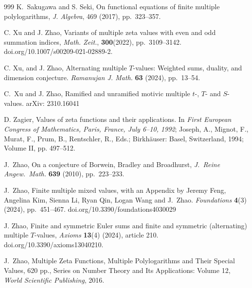\documentclass{article}
\theoremstyle{plain}
\theoremstyle{definition}
\begin{document}
\begin{thebibliography}{999}
K.\ Sakugawa and S. Seki, On functional equations of finite multiple polylogarithms, \emph{J. Algebra}, 469 (2017), pp.\ 323--357.

C. Xu and J. Zhao, Variants of multiple zeta values with even and odd summation indices,
\emph{Math. Zeit.}, \textbf{300}(2022), pp.\ 3109--3142.
doi.org/10.1007/s00209-021-02889-2.

C. Xu, and J. Zhao, Alternating multiple $T$-values: Weighted sums, duality, and dimension conjecture.
\emph{Ramanujan J. Math.} \textbf{63} (2024), pp.\ 13--54.

C.\ Xu and J. Zhao, Ramified and unramified motivic multiple $t$-, $T$- and $S$-values. arXiv: 2310.16041

D. Zagier, Values of zeta functions and their applications.
In \emph{First European Congress of Mathematics, Paris, France, July 6--10, 1992}; Joseph, A., Mignot,
F., Murat, F., Prum, B., Rentschler, R., Eds.; Birkh\"auser: Basel, Switzerland, 1994; Volume II, pp. 497--512.

J.\ Zhao, On a conjecture of Borwein, Bradley and Broadhurst,
\emph{J.\ Reine Angew.\ Math.} \textbf{639} (2010), pp.\ 223--233.

J.\ Zhao, Finite multiple mixed values, with an Appendix by
Jeremy Feng, Angelina Kim, Sienna Li, Ryan Qin,  Logan Wang and J.\ Zhao.
\emph{Foundations} \textbf{4}(3) (2024), pp.\ 451--467. doi.org/10.3390/foundations4030029

J. Zhao, Finite and symmetric Euler sums and finite and symmetric (alternating) multiple $T$-values,
\emph{Axioms} \textbf{13}(4) (2024), article 210. doi.org/10.3390/axioms13040210.

J.\ Zhao, Multiple Zeta Functions, Multiple Polylogarithms and Their Special Values, 620 pp., Series on Number Theory and Its Applications: Volume 12, \emph{World Scientific Publishing}, 2016.

\end{thebibliography}
\end{document}
